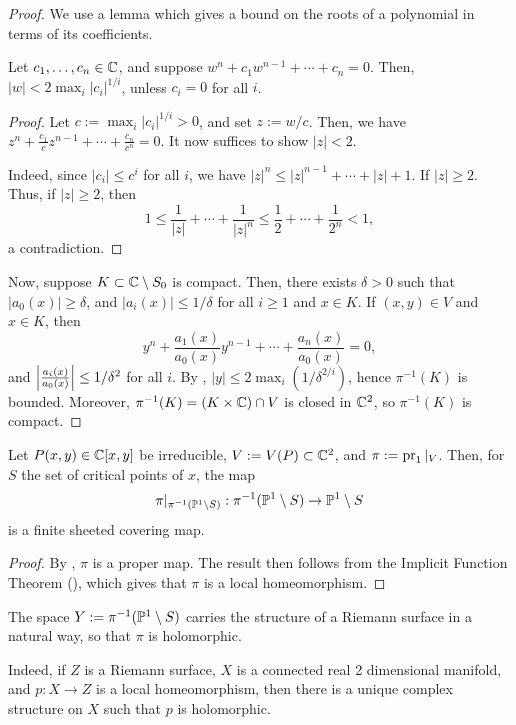 \documentclass[11pt]{article}
\begin{document}
\begin{proof}
We use a lemma which gives a bound on the roots of a polynomial in terms of its coefficients.
\begin{lem}[][label=lem:rootbound]
    Let $c_1,\dots,c_n \in \C$, and suppose $w^n+c_1w^{n-1}+\cdots + c_n=0$. Then, $|w|<2 \max _{i}|c_i|^{1/i}$, unless $c_i=0$ for all $i$.
\end{lem}

\begin{proof}
    Let $c:= \max_i |c_i|^{1/i}>0$, and set $z:=w/c$. Then, we have $z^n+\frac{c_1}{c}z^{n-1}+\cdots + \frac{c_n}{c^n}=0$. It now suffices to show $|z|<2$.

    Indeed, since $|c_i| \leq c^i$ for all $i$, we have $|z|^n \leq |z|^{n-1}+\cdots + |z|+1$. If $|z| \geq 2$. Thus, if $|z| \geq 2$, then
    $$1 \leq \frac{1}{|z|}+\cdots + \frac{1}{|z|^n}\leq \frac{1}{2}+\cdots + \frac{1}{2^n}<1,$$
    a contradiction.
\end{proof}
    Now, suppose $K \subset \C \setminus S_0$ is compact. Then, there exists $\delta>0$ such that $|a_0(x)| \geq \delta$, and $|a_i(x)| \leq 1/\delta$ for all $i \geq 1$ and $x \in K$. If $(x,y) \in V$ and $x \in K$, then
    $$y^n+\frac{a_1(x)}{a_0(x)}y^{n-1} +\cdots + \frac{a_n(x)}{a_0(x)}=0,$$
    and $\abs{\frac{a_i(x)}{a_0(x)}}\leq 1/\delta^2$ for all $i$. By , $|y| \leq 2\max_i(1/\delta^{2/i})$, hence $\pi^{-1}(K)$ is bounded. Moreover, $\pi^{-1}(K) =(K \times \C) \cap V$ is closed in $\C^2$, so $\pi^{-1}(K)$ is compact.
\end{proof}

\begin{cor}
    Let $P(x,y) \in \C[x,y]$ be irreducible, $V:=V(P) \subset \C^2$, and $\pi :=\w{pr}_1|_V$. Then, for $S$ the set of critical points of $x$, the map
    $$\pi|_{\pi^{-1}(\P^1\setminus S) }:\pi^{-1}(\P^1 \setminus S) \to \P^1 \setminus S$$
    is a finite sheeted covering map.
\end{cor}

\begin{proof}
    By , $\pi$ is a proper map. The result then follows from the Implicit Function Theorem (), which gives that $\pi$ is a local homeomorphism.
\end{proof}

\begin{rmk}
The space $Y:= \pi^{-1}(\P^1\setminus S)$ carries the structure of a Riemann surface in a natural way, so that $\pi$ is holomorphic. 
\end{rmk}
Indeed, if $Z$ is a Riemann surface, $X$ is a connected real 2 dimensional manifold, and $p:X \to Z$ is a local homeomorphism, then there is a unique complex structure on $X$ such that $p$ is holomorphic.
\end{document}
